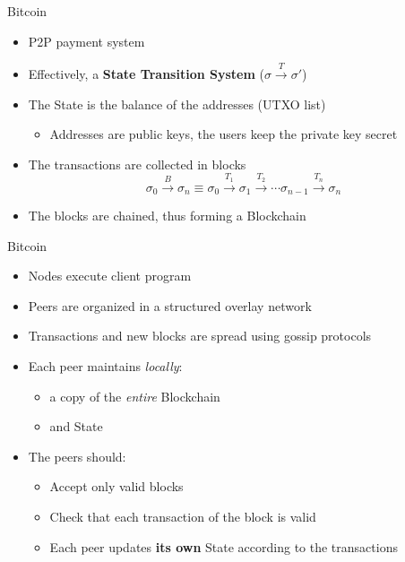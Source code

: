 
\begin{frame}{Bitcoin~\cite{nakamoto2008bitcoin}}
    \begin{itemize}
        \item P2P payment system
        \item Effectively, a \textbf{State Transition System} ($\sigma \xrightarrow{T} \sigma'$)
        \item The State is the balance of the
        addresses (UTXO list)
            \begin{itemize}
            \item Addresses are public keys, the users keep the private key secret
            \end{itemize}
        \item The transactions are collected in blocks
		$$
        \sigma_{0} \xrightarrow{B} \sigma_n \equiv 
        \sigma_{0} \xrightarrow{T_1} \sigma_1 \xrightarrow{T_2} \cdots
        \sigma_{n-1} \xrightarrow{T_n} \sigma_{n}
        $$
        \item The blocks are chained, thus forming a Blockchain 
    \end{itemize}
\end{frame}

\begin{frame}{Bitcoin~\cite{nakamoto2008bitcoin}}
\begin{itemize}
	\item Nodes execute client program
	\item Peers are organized in a structured overlay network
	\item Transactions and new blocks are spread using gossip protocols
    \item Each peer maintains \emph{locally}:
    \begin{itemize} 
    \item a copy of the \emph{entire} Blockchain
	\item and State
    \end{itemize}
    
    \item The peers should:
    \begin{itemize}
    	\item Accept only valid blocks
        \item Check that each transaction of the block is valid
    	\item Each peer updates \textbf{its own} State according to the transactions
    \end{itemize}
\end{itemize}

\end{frame}



